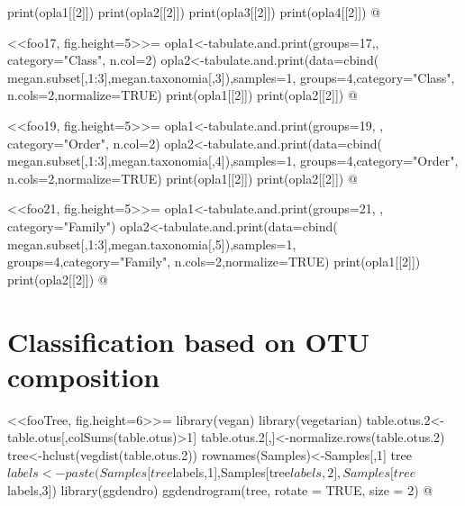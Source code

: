 \documentclass[12pt]{article}
\begin{document}
print(opla1[[2]])
print(opla2[[2]])
print(opla3[[2]])
print(opla4[[2]])
@

<<foo17, fig.height=5>>=
opla1<-tabulate.and.print(groups=17,, category="Class", n.col=2)
opla2<-tabulate.and.print(data=cbind( megan.subset[,1:3],megan.taxonomia[,3]),samples=1, groups=4,category="Class", n.cols=2,normalize=TRUE)
print(opla1[[2]])
print(opla2[[2]])
@

<<foo19, fig.height=5>>=
opla1<-tabulate.and.print(groups=19, , category="Order", n.col=2)
opla2<-tabulate.and.print(data=cbind( megan.subset[,1:3],megan.taxonomia[,4]),samples=1, groups=4,category="Order", n.cols=2,normalize=TRUE)
print(opla1[[2]])
print(opla2[[2]])
@

<<foo21, fig.height=5>>=
opla1<-tabulate.and.print(groups=21, , category="Family")
opla2<-tabulate.and.print(data=cbind( megan.subset[,1:3],megan.taxonomia[,5]),samples=1, groups=4,category="Family", n.cols=2,normalize=TRUE)
print(opla1[[2]])
print(opla2[[2]])
@

\section{Classification based on OTU composition}

<<fooTree, fig.height=6>>=
library(vegan)
library(vegetarian)
table.otus.2<-table.otus[,colSums(table.otus)>1]
table.otus.2[,]<-normalize.rows(table.otus.2)
tree<-hclust(vegdist(table.otus.2))
rownames(Samples)<-Samples[,1]
tree$labels<-paste(Samples[tree$labels,1],Samples[tree$labels,2],Samples[tree$labels,3])
library(ggdendro)
ggdendrogram(tree, rotate = TRUE, size = 2)
@
\end{document}
